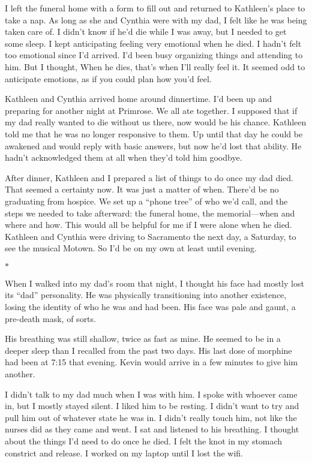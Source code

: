 \documentclass[12pt]{book}
\begin{document}
I left the funeral home with a form to fill out and returned to Kathleen's place to take a nap. As long as she and Cynthia were with my dad, I felt like he was being taken care of. I didn't know if he'd die while I was away, but I needed to get some sleep. I kept anticipating feeling very emotional when he died. I hadn't felt too emotional since I'd arrived. I'd been busy organizing things and attending to him. But I thought, When he dies, that's when I'll really feel it. It seemed odd to anticipate emotions, as if you could plan how you'd feel.

Kathleen and Cynthia arrived home around dinnertime. I'd been up and preparing for another night at Primrose. We all ate together. I supposed that if my dad really wanted to die without us there, now would be his chance. Kathleen told me that he was no longer responsive to them. Up until that day he could be awakened and would reply with basic answers, but now he'd lost that ability. He hadn't acknowledged them at all when they'd told him goodbye.

After dinner, Kathleen and I prepared a list of things to do once my dad died. That seemed a certainty now. It was just a matter of when. There'd be no graduating from hospice. We set up a ``phone tree'' of who we'd call, and the steps we needed to take afterward: the funeral home, the memorial---when and where and how. This would all be helpful for me if I were alone when he died. Kathleen and Cynthia were driving to Sacramento the next day, a Saturday, to see the musical Motown. So I'd be on my own at least until evening.

\begin{center}$*$\end{center}

When I walked into my dad's room that night, I thought his face had mostly lost its ``dad'' personality. He was physically transitioning into another existence, losing the identity of who he was and had been. His face was pale and gaunt, a pre-death mask, of sorts.

His breathing was still shallow, twice as fast as mine. He seemed to be in a deeper sleep than I recalled from the past two days. His last dose of morphine had been at 7:15 that evening. Kevin would arrive in a few minutes to give him another.

I didn't talk to my dad much when I was with him. I spoke with whoever came in, but I mostly stayed silent. I liked him to be resting. I didn't want to try and pull him out of whatever state he was in. I didn't really touch him, not like the nurses did as they came and went. I sat and listened to his breathing. I thought about the things I'd need to do once he died. I felt the knot in my stomach constrict and release. I worked on my laptop until I lost the wifi.
\end{document}
